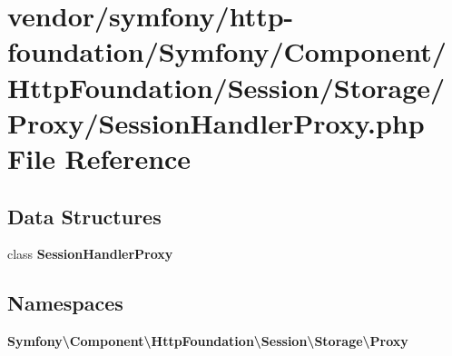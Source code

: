\section{vendor/symfony/http-\/foundation/\+Symfony/\+Component/\+Http\+Foundation/\+Session/\+Storage/\+Proxy/\+Session\+Handler\+Proxy.php File Reference}
\label{_session_handler_proxy_8php}
\subsection*{Data Structures}
\begin{DoxyCompactItemize}
\item 
class {\bf Session\+Handler\+Proxy}
\end{DoxyCompactItemize}
\subsection*{Namespaces}
\begin{DoxyCompactItemize}
\item 
 {\bf Symfony\textbackslash{}\+Component\textbackslash{}\+Http\+Foundation\textbackslash{}\+Session\textbackslash{}\+Storage\textbackslash{}\+Proxy}
\end{DoxyCompactItemize}
